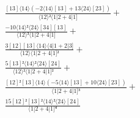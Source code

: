 \documentclass[varwidth, border=5pt]{standalone}
\begin{document}
\begin{my}
$\begin{gathered}
\scriptscriptstyle\frac{[13]⟨14⟩(-2⟨14⟩[13]+13⟨24⟩[23])}{⟨12⟩²⟨1|2+4|1]} +\\
\scriptscriptstyle\frac{-10⟨14⟩²⟨24⟩[34][13]}{⟨12⟩³⟨1|2+4|1]} +\\
\scriptscriptstyle\frac{3[12][13]⟨14⟩⟨4|1+2|3]}{⟨12⟩⟨1|2+4|1]²} +\\
\scriptscriptstyle\frac{5[13]²⟨14⟩²⟨24⟩[24]}{⟨12⟩²⟨1|2+4|1]²} +\\
\scriptscriptstyle\frac{[12]²[13]⟨14⟩(-5⟨14⟩[13]+10⟨24⟩[23])}{⟨1|2+4|1]³} +\\
\scriptscriptstyle\frac{15[12]²[13]²⟨14⟩²⟨24⟩[24]}{⟨1|2+4|1]⁴} \phantom{+}
\end{gathered}$
\end{my}
\end{document}
